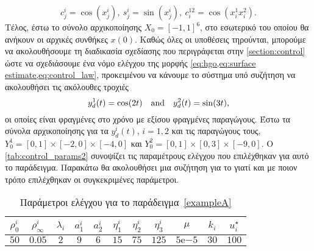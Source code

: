 \[
    c_j^i = \cos(x_j^i),\ s^i_j = \sin(x_j^i),\ c_i^{12} = \cos(x_i^1 x_i^2).
\]
Τέλος, έστω το σύνολο αρχικοποίησης $X_0 = [-1,1]^6$, στο εσωτερικό του οποίου θα ανήκουν οι αρχικές συνθήκες $x(0)$. Καθώς όλες οι υποθέσεις τηρούνται, μπορούμε να ακολουθήσουμε τη διαδικασία σχεδίασης που περιγράφεται στην \cref{section:control} ώστε να σχεδιάσουμε ένα νόμο ελέγχου της μορφής \cref{eq:hgo,eq:surface estimate,eq:control_law}, προκειμένου να κάνουμε το σύστημα υπό συζήτηση να ακολουθήσει τις ακόλουθες τροχιές
\[
    y_d^1(t) = \cos(2 t) \qq{and} y_d^2(t) = \sin(3 t),
\]
οι οποίες είναι φραγμένες στο χρόνο με εξίσου φραγμένες παραγώγους. Έστω τα σύνολα αρχικοποίησης για τα $y_d^i(t)$, $i=1,2$ και τις παραγώγους τους, $Y_0^1 = [0, 1] \times [-2,0] \times[-4, 0]$ και $Y_0^2 = [0,1] \times [0,3] \times[-9, 0]$. Ο \cref{tab:control_params2} συνοψίζει τις παραμέτρους ελέγχου που επιλέχθηκαν για αυτό το παράδειγμα. Παρακάτω θα ακολουθήσει μια συζήτηση για το γιατί και με ποιον τρόπο επιλέχθηκαν οι συγκεκριμένες παράμετροι. 

\begin{table}
    \centering
    \caption{Παράμετροι ελέγχου για το παράδειγμα~\ref{exampleA}}
    \label{tab:control_params1}
    \begin{tabular}{ccccccccccc}
        \toprule
        $\rho_0^i$ & $\rho_\infty^i$ & $\lambda_i$ & $a_1^i$ & $a_2^i$ & 
        $\eta_1^i$ & $\eta_2^i$ & $\eta_3^i$ & $\mu$ & $k_i$ & 
        $u_i^\star$ \\ \midrule
        $50$ & $0.05$ & $2$ & $9$ & $6$ & $15$ & $75$ & $125$ & 
        $5\mathrm{e}{-5}$ & $30$ & $100$ \\ \bottomrule
    \end{tabular}
\end{table}

